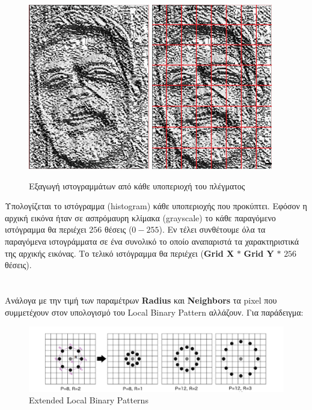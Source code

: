 \begin{figure}[htp]
    \centering
    \includegraphics[width=.20\textwidth]{../figures/lbph3.png}\hspace{50pt}%
    \includegraphics[width=.20\textwidth]{../figures/lbph5.png}\hfill

    \caption{Εξαγωγή ιστογραμμάτων από κάθε υποπεριοχή του πλέγματος}
    \label{fig:lbph3}

\end{figure}

Υπολογίζεται το ιστόγραμμα (histogram) κάθε υποπεριοχής που προκύπτει. Εφόσον η
αρχική εικόνα ήταν σε ασπρόμαυρη κλίμακα (grayscale) το κάθε παραγόμενο ιστόγραμμα
θα περιέχει $256$ θέσεις ($0-255$). Εν τέλει συνθέτουμε όλα τα παραγόμενα ιστογράμματα
σε ένα συνολικό το οποίο αναπαριστά τα χαρακτηριστικά της αρχικής εικόνας. Το τελικό
ιστόγραμμα θα περιέχει (\textbf{Grid X} $*$ \textbf{Grid Y} $*$ $256$ θέσεις).
\paragraph{} \hspace{0em} \\
Ανάλογα με την τιμή των παραμέτρων \textbf{Radius} και \textbf{Neighbors} τα pixel
που συμμετέχουν στον υπολογισμό του Local Binary Pattern αλλάζουν. Για παράδειγμα:
\begin{figure}[htbp]
  \begin{center}
    \includegraphics[width=0.8\maxwidth]{../figures/elbp.png}
      \caption{Extended Local Binary Patterns}
      \label{fig:elbp}
   \end{center}
\end{figure}


